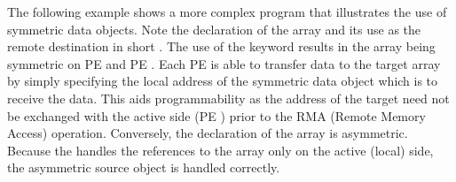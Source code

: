 The following example shows a more complex \openshmem program that illustrates the use of symmetric data objects. Note the declaration of the   array and its use as the remote destination in \openshmem short . The use of the  keyword results in the  array being symmetric on \ac{PE}  and \ac{PE} . Each \ac{PE} is able to transfer data to the target array by simply specifying the local address of the symmetric data object which is to receive the data. This aids programmability as the address of the target need not be exchanged with the active side (\ac{PE} ) prior to the RMA (Remote Memory Access) operation. Conversely, the declaration of the  array is asymmetric. Because the  handles the references to the  array only on the active (local) side, the asymmetric source object is handled correctly.

\begin{minipage}{\linewidth}
\vspace{0.1in}
\vspace{0.1in}
\end{minipage}
